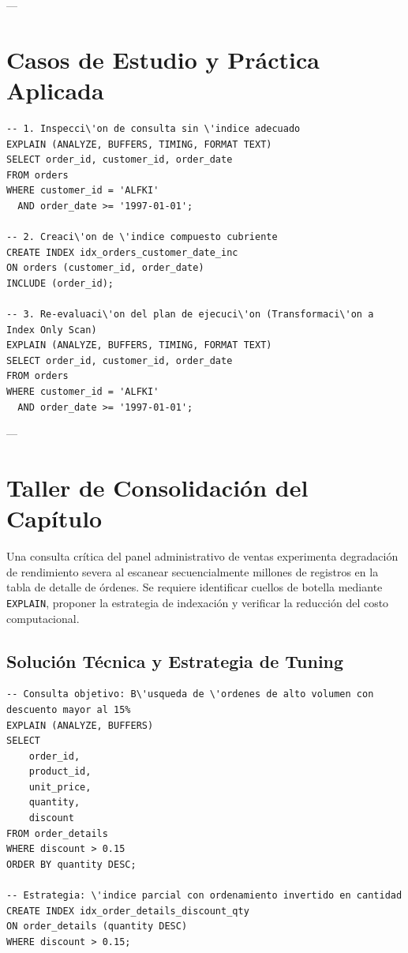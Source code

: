 ---

\section{Casos de Estudio y Pr\'actica Aplicada}

\begin{lstlisting}[style=sqlstyle, caption={An\'alisis comparativo de costos con EXPLAIN ANALYZE}]
-- 1. Inspecci\'on de consulta sin \'indice adecuado
EXPLAIN (ANALYZE, BUFFERS, TIMING, FORMAT TEXT)
SELECT order_id, customer_id, order_date
FROM orders
WHERE customer_id = 'ALFKI'
  AND order_date >= '1997-01-01';

-- 2. Creaci\'on de \'indice compuesto cubriente
CREATE INDEX idx_orders_customer_date_inc
ON orders (customer_id, order_date)
INCLUDE (order_id);

-- 3. Re-evaluaci\'on del plan de ejecuci\'on (Transformaci\'on a Index Only Scan)
EXPLAIN (ANALYZE, BUFFERS, TIMING, FORMAT TEXT)
SELECT order_id, customer_id, order_date
FROM orders
WHERE customer_id = 'ALFKI'
  AND order_date >= '1997-01-01';
\end{lstlisting}

---

\section{Taller de Consolidaci\'on del Cap\'itulo}

\begin{businessproblem}
Una consulta cr\'itica del panel administrativo de ventas experimenta degradaci\'on de rendimiento severa al escanear secuencialmente millones de registros en la tabla de detalle de \'ordenes. Se requiere identificar cuellos de botella mediante \texttt{EXPLAIN}, proponer la estrategia de indexaci\'on y verificar la reducci\'on del costo computacional.
\end{businessproblem}

\subsection{Soluci\'on T\'ecnica y Estrategia de Tuning}

\begin{lstlisting}[style=sqlstyle, caption={Optimizaci\'on de consulta anal\'itica y creaci\'on de \'indice GIN / Parcial}]
-- Consulta objetivo: B\'usqueda de \'ordenes de alto volumen con descuento mayor al 15%
EXPLAIN (ANALYZE, BUFFERS)
SELECT
    order_id,
    product_id,
    unit_price,
    quantity,
    discount
FROM order_details
WHERE discount > 0.15
ORDER BY quantity DESC;

-- Estrategia: \'indice parcial con ordenamiento invertido en cantidad
CREATE INDEX idx_order_details_discount_qty
ON order_details (quantity DESC)
WHERE discount > 0.15;
\end{lstlisting}

